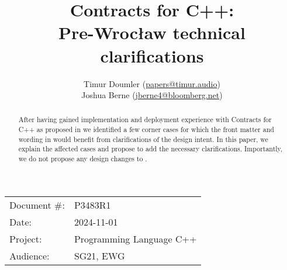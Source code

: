 

 \usepackage[bottom]{footmisc} 

 \usepackage{longtable}


\usepackage{tikz,lipsum,lmodern}
\usepackage[most]{tcolorbox}



\usepackage{titlesec}
\usepackage{tocloft}


\newcommand{\changelocaltocdepth}[1]{%
  \addtocontents{toc}{\protect\setcounter{tocdepth}{#1}}%
  \setcounter{tocdepth}{#1}%
}

\setcounter{tocdepth}{3}



\title{Contracts for C++: \\ Pre-Wroc\l aw technical clarifications}
\author{
Timur Doumler \small(\href{mailto:papers@timur.audio}{papers@timur.audio}) \\
Joshua Berne \small(\href{mailto:jberne4@bloomberg.net}{jberne4@bloomberg.net}) \\
}
\date{}
\maketitle

\begin{tabular}{ll}
Document \#: & P3483R1 \\
Date: &2024-11-01 \\
Project: & Programming Language C++ \\
Audience: & SG21, EWG
\end{tabular}

\begin{abstract}
After having gained implementation and deployment experience with Contracts for C++ as proposed in \cite{P2900R10} we identified a few corner cases for which the front matter and wording in \cite{P2900R10} would benefit from clarifications of the design intent. In this paper, we explain the affected cases and propose to add the necessary clarifications. Importantly, we do not propose any design changes to \cite{P2900R10}.
\end{abstract}

